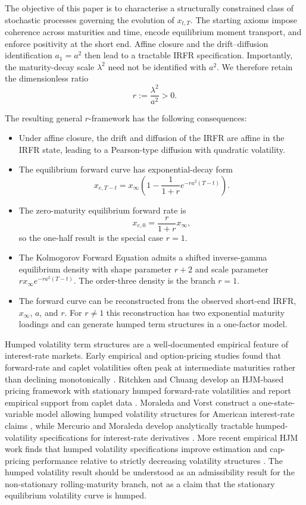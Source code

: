 \documentclass[12pt]{article}
\theoremstyle{statementstyle}
\begin{document}
The objective of this paper is to characterise a structurally constrained
class of stochastic processes governing the evolution of $x_{t,T}$. The
starting axioms impose coherence across maturities and time, encode
equilibrium moment transport, and enforce positivity at the short end.
Affine closure and the drift--diffusion identification $a_{1}=a^{2}$ then
lead to a tractable IRFR specification. Importantly, the maturity-decay
scale $\lambda^{2}$ need not be identified with $a^{2}$. We therefore
retain the dimensionless ratio
\[
r:=\frac{\lambda^{2}}{a^{2}}>0.
\]

The resulting general $r$-framework has the following consequences:

\begin{itemize}
\item Under affine closure, the drift and diffusion of the IRFR are affine
      in the IRFR state, leading to a Pearson-type diffusion with
      quadratic volatility.
\item The equilibrium forward curve has exponential-decay form
      \[
      x_{e,T-t}=x_{\infty}\left(1-\frac{1}{1+r}e^{-ra^{2}(T-t)}\right).
      \]
\item The zero-maturity equilibrium forward rate is
      \[
      x_{e,0}=\frac{r}{1+r}x_{\infty},
      \]
      so the one-half result is the special case $r=1$.
\item The Kolmogorov Forward Equation admits a shifted inverse-gamma
      equilibrium density with shape parameter $r+2$ and scale parameter
      $r x_{\infty}e^{-ra^{2}(T-t)}$. The order-three density is the
      branch $r=1$.
\item The forward curve can be reconstructed from the observed short-end
      IRFR, $x_{\infty}$, $a$, and $r$. For $r\neq 1$ this reconstruction
      has two exponential maturity loadings and can generate humped term
      structures in a one-factor model.
\end{itemize}

Humped volatility term structures are a well-documented empirical feature of
interest-rate markets. Early empirical and option-pricing studies found that
forward-rate and caplet volatilities often peak at intermediate maturities
rather than declining monotonically \cite{RitchkenChuang1999,
MercurioMoraleda2000}. Ritchken and Chuang develop an HJM-based pricing
framework with stationary humped forward-rate volatilities and report empirical
support from caplet data \cite{RitchkenChuang1999}. Moraleda and Vorst construct
a one-state-variable model allowing humped volatility structures for American
interest-rate claims \cite{MoraledaVorst1997}, while Mercurio and Moraleda
develop analytically tractable humped-volatility specifications for
interest-rate derivatives \cite{MercurioMoraleda2000,MercurioMoraleda2001}.
More recent empirical HJM work finds that humped volatility specifications
improve estimation and cap-pricing performance relative to strictly decreasing
volatility structures \cite{Falini2010}. The humped volatility result should be understood as an admissibility result for the non-stationary rolling-maturity branch, not as a claim that the stationary equilibrium volatility curve is humped.
\end{document}
